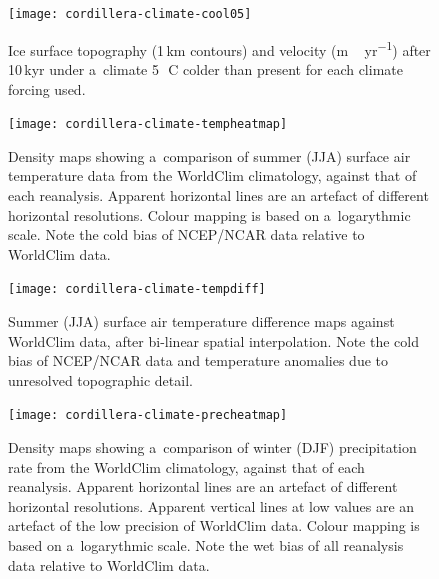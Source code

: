 \documentclass[tc, ms]{copernicus}
\begin{document}
\begin{figure}[t]
	\vspace*{2mm}
	\begin{center}
		\texttt{[image: cordillera-climate-cool05]}
	\end{center}
	\caption{Ice surface topography (1\,\unit{km} contours) and velocity (\unit{m\,yr^{-1}}) after 10\,kyr under a~climate 5\,\unit{{\degree}C} colder than present for each climate forcing used.}
	\label{fig:cool05}
\end{figure}

\begin{figure}[t]
	\vspace*{2mm}
	\begin{center}
		\texttt{[image: cordillera-climate-tempheatmap]}
	\end{center}
	\caption{Density maps showing a~comparison of summer (JJA) surface air temperature data from the WorldClim climatology, against that of each reanalysis. Apparent horizontal lines are an artefact of different horizontal resolutions. Colour mapping is based on a~logarythmic scale. Note the cold bias of NCEP/NCAR data relative to WorldClim data.}
	\label{fig:tempheatmap}
\end{figure}

\begin{figure}[t]
	\vspace*{2mm}
	\begin{center}
		\texttt{[image: cordillera-climate-tempdiff]}
	\end{center}
	\caption{Summer (JJA) surface air temperature difference maps against WorldClim data, after bi-linear spatial interpolation. Note the cold bias of NCEP/NCAR data and temperature anomalies due to unresolved topographic detail.}
	\label{fig:tempdiff}
\end{figure}

\begin{figure}[t]
	\vspace*{2mm}
	\begin{center}
		\texttt{[image: cordillera-climate-precheatmap]}
	\end{center}
	\caption{Density maps showing a~comparison of winter (DJF) precipitation rate from the WorldClim climatology, against that of each reanalysis. Apparent horizontal lines are an artefact of different horizontal resolutions. Apparent vertical lines at low values are an artefact of the low precision of WorldClim data. Colour mapping is based on a~logarythmic scale. Note the wet bias of all reanalysis data relative to WorldClim data.}
	\label{fig:precheatmap}
\end{figure}
\end{document}
